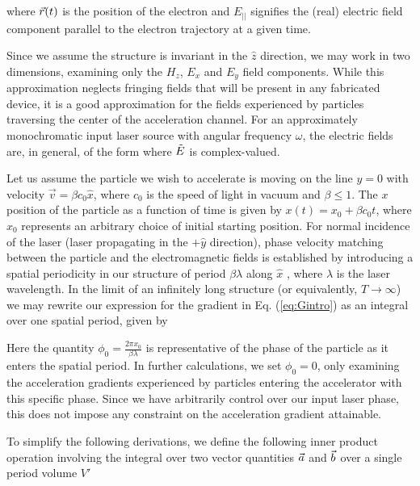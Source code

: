 %
where $\vec{r}(t)$ is the position of the electron and $E_{||}$ signifies the (real) electric field component parallel to the electron trajectory at a given time.

Since we assume the structure is invariant in the $\hat{z}$ direction, we may work in two dimensions, examining only the $H_z$, $E_x$ and $E_y$ field components.
While this approximation neglects fringing fields that will be present in any fabricated device, it is a good approximation for the fields experienced by particles traversing the center of the acceleration channel.
For an approximately monochromatic input laser source with angular frequency $\omega$, the electric fields are, in general, of the form
%
where $\tilde{E}$ is complex-valued.

Let us assume the particle we wish to accelerate is moving on the line $y=0$ with velocity $\vec{v} = \beta c_0 \hat{x}$, where $c_0$ is the speed of light in vacuum and $\beta \leq 1$.
The $x$ position of the particle as a function of time is given by $x(t) = x_0 + \beta c_0 t$, where $x_0$ represents an arbitrary choice of initial starting position.
For normal incidence of the laser (laser propagating in the $+\hat{y}$ direction), phase velocity matching between the particle and the electromagnetic fields is established by introducing a spatial periodicity in our structure of period $\beta \lambda$ along $\hat{x}$ , where $\lambda$ is the laser wavelength.
In the limit of an infinitely long structure (or equivalently, $T \to \infty $) we may rewrite our expression for the gradient in Eq. (\ref{eq:Gintro}) as an integral over one spatial period, given by

%
Here the quantity $\phi_0 = \frac{2\pi x_0}{\beta\lambda}$ is representative of the phase of the particle as it enters the spatial period.
In further calculations, we set $\phi_0 = 0$, only examining the acceleration gradients experienced by particles entering the accelerator with this specific phase.
Since we have arbitrarily control over our input laser phase, this does not impose any constraint on the acceleration gradient attainable.

To simplify the following derivations, we define the following inner product operation involving the integral over two vector quantities $\vec{a}$ and $\vec{b}$ over a single period volume $V'$
%


